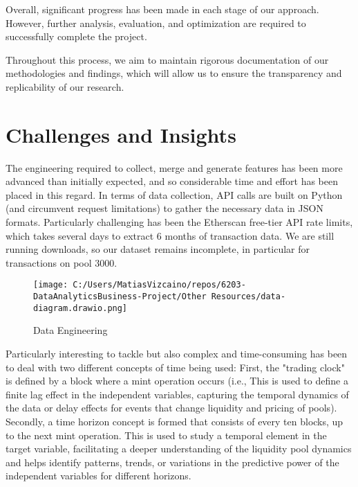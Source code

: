 \documentclass{article}
\begin{document}
{Overall, significant progress has been made in each stage of our approach. However, further analysis, evaluation, and optimization are required to successfully complete the project.

Throughout this process, we aim to maintain rigorous documentation of our methodologies and findings, which will allow us to ensure the transparency and replicability of our research.

\section*{Challenges and Insights}

The engineering required to collect, merge and generate features has been more advanced than initially expected, and so considerable time and effort has been placed in this regard.
In terms of data collection, API calls are built on Python (and circumvent request limitations) to gather the necessary data in JSON formats. Particularly challenging has been the Etherscan free-tier API rate limits, which takes several days to extract 6 months of transaction data. We are still running downloads, so our dataset remains incomplete, in particular for transactions on pool 3000.

\begin{wrapfigure}[19]{r}{0.35\textwidth}
\vspace{-35pt} %
\centering
\texttt{[image: C:/Users/MatiasVizcaino/repos/6203-DataAnalyticsBusiness-Project/Other Resources/data-diagram.drawio.png]}
\caption{Data Engineering}
\label{fig:data-diagram}
\end{wrapfigure}

Particularly interesting to tackle but also complex and time-consuming has been to deal with two different concepts of time being used:
First, the "trading clock" is defined by a block where a mint operation occurs (i.e., This is used to define a finite lag effect in the independent variables, capturing the temporal dynamics of the data or delay effects for events that change liquidity and pricing of pools).
Secondly, a time horizon concept is formed that consists of every ten blocks, up to the next mint operation. This is used to study a temporal element in the target variable, facilitating a deeper understanding of the liquidity pool dynamics and helps identify patterns, trends, or variations in the predictive power of the independent variables for different horizons. 

}
\end{document}
